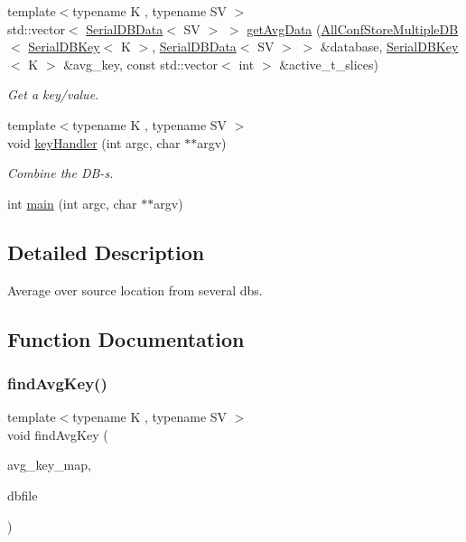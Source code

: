 \begin{DoxyCompactItemize}
{\footnotesize template$<$typename K , typename SV $>$ }\\std\+::vector$<$ \mbox{\hyperlink{classADATIO_1_1SerialDBData}{Serial\+D\+B\+Data}}$<$ SV $>$ $>$ \mbox{\hyperlink{adat-devel_2main_2dbutil_2dbavgsrc_8cc_ae56af043dd66c496a9f847b9b5a6d604}{get\+Avg\+Data}} (\mbox{\hyperlink{classFILEDB_1_1AllConfStoreMultipleDB}{All\+Conf\+Store\+Multiple\+DB}}$<$ \mbox{\hyperlink{classADATIO_1_1SerialDBKey}{Serial\+D\+B\+Key}}$<$ K $>$, \mbox{\hyperlink{classADATIO_1_1SerialDBData}{Serial\+D\+B\+Data}}$<$ SV $>$ $>$ \&database, \mbox{\hyperlink{classADATIO_1_1SerialDBKey}{Serial\+D\+B\+Key}}$<$ K $>$ \&avg\+\_\+key, const std\+::vector$<$ int $>$ \&active\+\_\+t\+\_\+slices)
\begin{DoxyCompactList}\small\item\em Get a key/value. \end{DoxyCompactList}\item 
{\footnotesize template$<$typename K , typename SV $>$ }\\void \mbox{\hyperlink{adat-devel_2main_2dbutil_2dbavgsrc_8cc_a57918e290614430413950cb4fdfd967e}{key\+Handler}} (int argc, char $\ast$$\ast$argv)
\begin{DoxyCompactList}\small\item\em Combine the D\+B-\/s. \end{DoxyCompactList}\item 
int \mbox{\hyperlink{adat-devel_2main_2dbutil_2dbavgsrc_8cc_a3c04138a5bfe5d72780bb7e82a18e627}{main}} (int argc, char $\ast$$\ast$argv)
\end{DoxyCompactItemize}


\subsection{Detailed Description}
Average over source location from several dbs. 



\subsection{Function Documentation}
\mbox{\label{adat-devel_2main_2dbutil_2dbavgsrc_8cc_a6b84b2344f757e5dab22137c76ba2912}} 
\subsubsection{\texorpdfstring{findAvgKey()}{findAvgKey()}}
{\footnotesize\ttfamily template$<$typename K , typename SV $>$ \\
void find\+Avg\+Key (\begin{DoxyParamCaption}\item[{\mbox{\hyperlink{classADAT_1_1MapObject}{Map\+Object}}$<$ K, int $>$ \&}]{avg\+\_\+key\+\_\+map,  }\item[{const std\+::string \&}]{dbfile }\end{DoxyParamCaption})}



